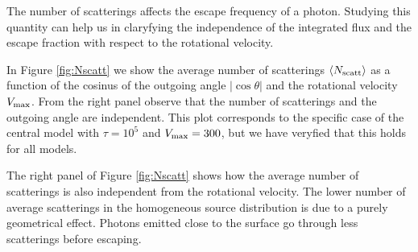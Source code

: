 \documentclass{emulateapj}
\newcommand{\ly}{{\ifmmode{{\rm Ly}\alpha~}\else{Ly$\alpha$~}\fi}}
\newcommand{\kms}{{\ifmmode{{\mathrm{\,km\ s}^{-1}}}\else{\,km~s$^{-1}$}\fi}}
\begin{document}
The number of scatterings affects the escape frequency of a \ly
photon. 
Studying this quantity can help us in claryfying the independence of
the integrated flux and the escape fraction with respect to the
rotational velocity.



In Figure \ref{fig:Nscatt} we show the average number of scatterings
$\langle N_{\rm scatt}\rangle$ as a function of the cosinus of the
outgoing angle $|\cos\theta|$ and the rotational velocity
$V_{\rm max}$. 
From the right panel observe that the number of scatterings and the
outgoing angle are independent. 
This plot corresponds to the specific case of the central model with
$\tau=10^5$ and $V_{\rm max}=300$\kms, but we have veryfied that this
holds for all models. 


The right panel of Figure \ref{fig:Nscatt} shows how the average
number of scatterings is also independent from the rotational
velocity. 
The lower number of average scatterings in the homogeneous source
distribution is due to a purely geometrical effect.
Photons emitted close to the surface go through less scatterings
before escaping.



\end{document}
